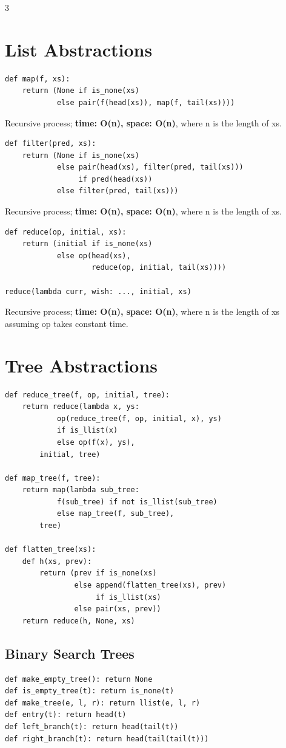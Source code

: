\documentclass[9pt,landscape]{extarticle}
\begin{document}
\begin{multicols*}{3}
\section*{List Abstractions}
\begin{lstlisting}
def map(f, xs):
    return (None if is_none(xs)
            else pair(f(head(xs)), map(f, tail(xs))))
\end{lstlisting}
Recursive process; \textbf{time: O(n), space: O(n)}, where n is the length of xs.

\begin{lstlisting}
def filter(pred, xs):
    return (None if is_none(xs)
            else pair(head(xs), filter(pred, tail(xs)))
                 if pred(head(xs))
            else filter(pred, tail(xs)))
\end{lstlisting}
Recursive process; \textbf{time: O(n), space: O(n)}, where n is the length of xs.

\begin{lstlisting}
def reduce(op, initial, xs):
    return (initial if is_none(xs)
            else op(head(xs),
                    reduce(op, initial, tail(xs))))

reduce(lambda curr, wish: ..., initial, xs)
\end{lstlisting}
Recursive process; \textbf{time: O(n), space: O(n)}, where n is the length of xs assuming op takes constant time.

\section*{Tree Abstractions}
\begin{lstlisting}
def reduce_tree(f, op, initial, tree):
    return reduce(lambda x, ys:
            op(reduce_tree(f, op, initial, x), ys)
            if is_llist(x)
            else op(f(x), ys),
        initial, tree)

def map_tree(f, tree):
    return map(lambda sub_tree:
            f(sub_tree) if not is_llist(sub_tree)
            else map_tree(f, sub_tree),
        tree)

def flatten_tree(xs):
    def h(xs, prev):
        return (prev if is_none(xs)
                else append(flatten_tree(xs), prev)
                     if is_llist(xs)
                else pair(xs, prev))
    return reduce(h, None, xs)
\end{lstlisting}

\subsection*{Binary Search Trees}
\begin{lstlisting}
def make_empty_tree(): return None
def is_empty_tree(t): return is_none(t)
def make_tree(e, l, r): return llist(e, l, r)
def entry(t): return head(t)
def left_branch(t): return head(tail(t))
def right_branch(t): return head(tail(tail(t)))


\end{lstlisting}
\end{multicols*}
\end{document}
